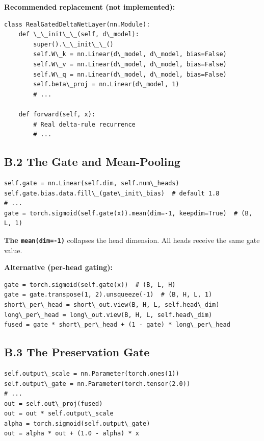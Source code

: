 \textbf{Recommended replacement (not implemented):}

\begin{lstlisting}
class RealGatedDeltaNetLayer(nn.Module):
    def \_\_init\_\_(self, d\_model):
        super().\_\_init\_\_()
        self.W\_k = nn.Linear(d\_model, d\_model, bias=False)
        self.W\_v = nn.Linear(d\_model, d\_model, bias=False)
        self.W\_q = nn.Linear(d\_model, d\_model, bias=False)
        self.beta\_proj = nn.Linear(d\_model, 1)
        # ...

    def forward(self, x):
        # Real delta-rule recurrence
        # ...
\end{lstlisting}

\subsection{B.2 The Gate and Mean-Pooling}

\begin{lstlisting}
self.gate = nn.Linear(self.dim, self.num\_heads)
self.gate.bias.data.fill\_(gate\_init\_bias)  # default 1.8
# ...
gate = torch.sigmoid(self.gate(x)).mean(dim=-1, keepdim=True)  # (B, L, 1)
\end{lstlisting}

\textbf{The \texttt{mean(dim=-1)}} collapses the head dimension. All heads receive the 
same gate value.

\textbf{Alternative (per-head gating):}

\begin{lstlisting}
gate = torch.sigmoid(self.gate(x))  # (B, L, H)
gate = gate.transpose(1, 2).unsqueeze(-1)  # (B, H, L, 1)
short\_per\_head = short\_out.view(B, H, L, self.head\_dim)
long\_per\_head = long\_out.view(B, H, L, self.head\_dim)
fused = gate * short\_per\_head + (1 - gate) * long\_per\_head
\end{lstlisting}

\subsection{B.3 The Preservation Gate}

\begin{lstlisting}
self.output\_scale = nn.Parameter(torch.ones(1))
self.output\_gate = nn.Parameter(torch.tensor(2.0))
# ...
out = self.out\_proj(fused)
out = out * self.output\_scale
alpha = torch.sigmoid(self.output\_gate)
out = alpha * out + (1.0 - alpha) * x
\end{lstlisting}

